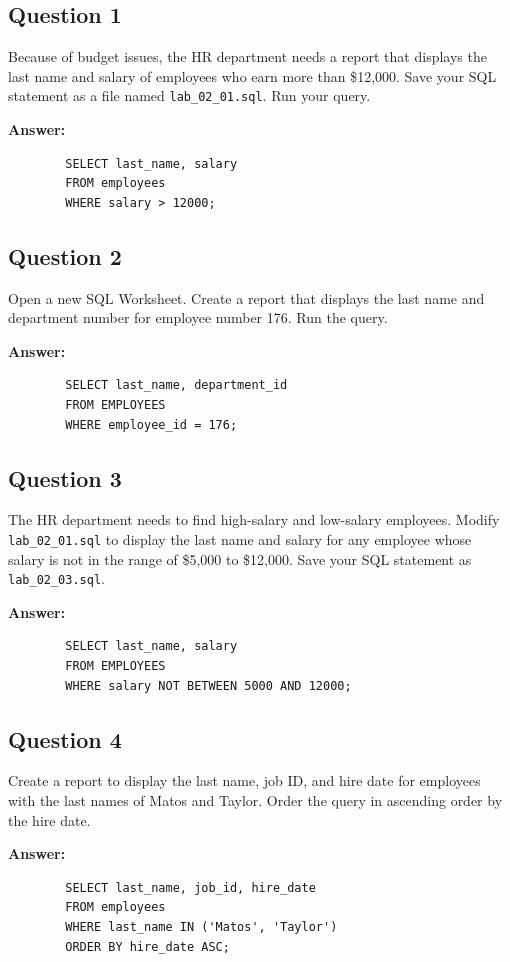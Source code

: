\documentclass[12pt,a4paper]{article}
\begin{document}
\subsection*{Question 1}
Because of budget issues, the HR department needs a report that displays the last name and 
salary of employees who earn more than \$12,000. Save your SQL statement as a file named 
\texttt{lab\_02\_01.sql}. Run your query.

\textbf{Answer:}
    \begin{lstlisting}
        SELECT last_name, salary
        FROM employees
        WHERE salary > 12000;
    \end{lstlisting}

\subsection*{Question 2}
Open a new SQL Worksheet. Create a report that displays the last name and department number 
for employee number 176. Run the query.

\textbf{Answer:}
    \begin{lstlisting}
        SELECT last_name, department_id
        FROM EMPLOYEES
        WHERE employee_id = 176;
    \end{lstlisting}

\subsection*{Question 3}
The HR department needs to find high-salary and low-salary employees. 
Modify \texttt{lab\_02\_01.sql} to display the last name and salary for any employee whose salary is not in 
the range of \$5,000 to \$12,000. Save your SQL statement as \texttt{lab\_02\_03.sql}.

\textbf{Answer:}
    \begin{lstlisting}
        SELECT last_name, salary
        FROM EMPLOYEES
        WHERE salary NOT BETWEEN 5000 AND 12000;
    \end{lstlisting}

\subsection*{Question 4}
Create a report to display the last name, job ID, and hire date for employees with the last names 
of Matos and Taylor. Order the query in ascending order by the hire date.

\textbf{Answer:}
    \begin{lstlisting}
        SELECT last_name, job_id, hire_date
        FROM employees
        WHERE last_name IN ('Matos', 'Taylor')
        ORDER BY hire_date ASC;
    \end{lstlisting}
\end{document}
